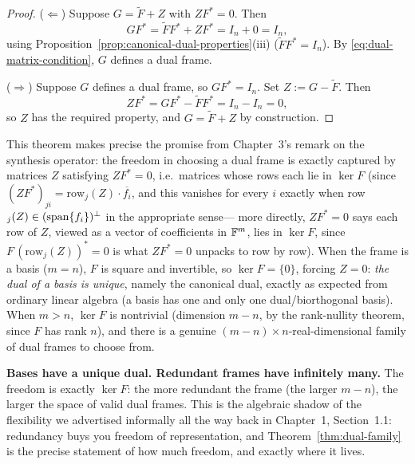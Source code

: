 \begin{proof}
($\Leftarrow$) Suppose $G=\tilde F+Z$ with $ZF^*=0$. Then
\[
  GF^* = \tilde F F^* + ZF^* = I_n + 0 = I_n,
\]
using Proposition~\ref{prop:canonical-dual-properties}(iii)
($\tilde FF^*=I_n$). By \eqref{eq:dual-matrix-condition}, $G$ defines a
dual frame.

($\Rightarrow$) Suppose $G$ defines a dual frame, so $GF^*=I_n$. Set
$Z := G - \tilde F$. Then
\[
  ZF^* = GF^* - \tilde FF^* = I_n - I_n = 0,
\]
so $Z$ has the required property, and $G=\tilde F+Z$ by construction.
\end{proof}

\begin{remark*}
This theorem makes precise the promise from Chapter~3's remark on the
synthesis operator: the freedom in choosing a dual frame is exactly
captured by matrices $Z$ satisfying $ZF^*=0$, i.e.\ matrices whose rows
each lie in $\ker F$ (since $(ZF^*)_{ji}=\text{row}_j(Z)\cdot
\overline{f_i}$, and this vanishes for every $i$ exactly when
row$_j(Z) \in (\operatorname{span}\{f_i\})^\perp$ in the appropriate sense--- more
directly, $ZF^*=0$ says each row of $Z$, viewed as a vector of
coefficients in $\mathbb{F}^m$, lies in $\ker F$, since $F\,(\text{row}_j(Z))^*=
0$ is what $ZF^*=0$ unpacks to row by row). When the frame is a basis
($m=n$), $F$ is square and invertible, so $\ker F=\{0\}$, forcing $Z=0$:
\emph{the dual of a basis is unique}, namely the canonical dual, exactly
as expected from ordinary linear algebra (a basis has one and only one
dual/biorthogonal basis). When $m>n$, $\ker F$ is nontrivial
(dimension $m-n$, by the rank-nullity theorem, since $F$ has rank $n$),
and there is a genuine $(m-n)\times n$-real-dimensional family of dual
frames to choose from.
\end{remark*}

\begin{keyidea}
\textbf{Bases have a unique dual. Redundant frames have infinitely
many.} The freedom is exactly $\ker F$: the more redundant the frame
(the larger $m-n$), the larger the space of valid dual frames. This is
the algebraic shadow of the flexibility we advertised informally all the
way back in Chapter~1, Section~1.1: redundancy buys you freedom of
representation, and Theorem~\ref{thm:dual-family} is the precise
statement of how much freedom, and exactly where it lives.
\end{keyidea}

